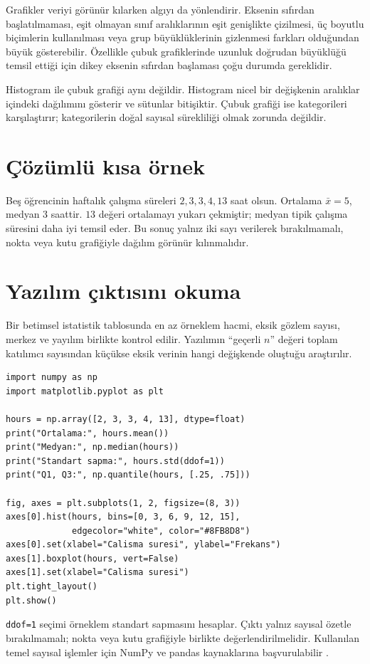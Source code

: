 Grafikler veriyi görünür kılarken algıyı da yönlendirir. Eksenin sıfırdan
başlatılmaması, eşit olmayan sınıf aralıklarının eşit genişlikte çizilmesi,
üç boyutlu biçimlerin kullanılması veya grup büyüklüklerinin gizlenmesi farkları
olduğundan büyük gösterebilir. Özellikle çubuk grafiklerinde uzunluk doğrudan
büyüklüğü temsil ettiği için dikey eksenin sıfırdan başlaması çoğu durumda
gereklidir.

Histogram ile çubuk grafiği aynı değildir. Histogram nicel bir değişkenin
aralıklar içindeki dağılımını gösterir ve sütunlar bitişiktir. Çubuk grafiği
ise kategorileri karşılaştırır; kategorilerin doğal sayısal sürekliliği olmak
zorunda değildir.

\section{Çözümlü kısa örnek}

Beş öğrencinin haftalık çalışma süreleri $2,3,3,4,13$ saat olsun. Ortalama
$\bar{x}=5$, medyan $3$ saattir. $13$ değeri ortalamayı yukarı çekmiştir;
medyan tipik çalışma süresini daha iyi temsil eder. Bu sonuç yalnız iki sayı
verilerek bırakılmamalı, nokta veya kutu grafiğiyle dağılım görünür
kılınmalıdır.

\section{Yazılım çıktısını okuma}

Bir betimsel istatistik tablosunda en az örneklem hacmi, eksik gözlem sayısı,
merkez ve yayılım birlikte kontrol edilir. Yazılımın ``geçerli $n$'' değeri
toplam katılımcı sayısından küçükse eksik verinin hangi değişkende oluştuğu
araştırılır.

\begin{softwarebox}
\begin{lstlisting}
import numpy as np
import matplotlib.pyplot as plt

hours = np.array([2, 3, 3, 4, 13], dtype=float)
print("Ortalama:", hours.mean())
print("Medyan:", np.median(hours))
print("Standart sapma:", hours.std(ddof=1))
print("Q1, Q3:", np.quantile(hours, [.25, .75]))

fig, axes = plt.subplots(1, 2, figsize=(8, 3))
axes[0].hist(hours, bins=[0, 3, 6, 9, 12, 15],
             edgecolor="white", color="#8FB8D8")
axes[0].set(xlabel="Calisma suresi", ylabel="Frekans")
axes[1].boxplot(hours, vert=False)
axes[1].set(xlabel="Calisma suresi")
plt.tight_layout()
plt.show()
\end{lstlisting}
\texttt{ddof=1} seçimi örneklem standart sapmasını hesaplar. Çıktı yalnız
sayısal özetle bırakılmamalı; nokta veya kutu grafiğiyle birlikte
değerlendirilmelidir. Kullanılan temel sayısal işlemler için NumPy ve pandas
kaynaklarına başvurulabilir \citep{harris2020,mckinney2022}.
\end{softwarebox}

